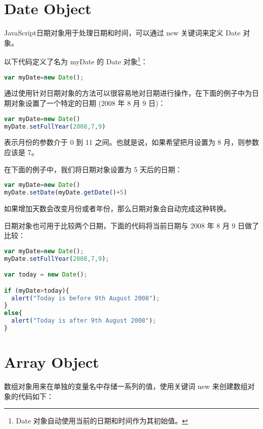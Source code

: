 \section{Date Object}


JavaScript日期对象用于处理日期和时间，可以通过 new 关键词来定义 Date 对象。

以下代码定义了名为 myDate 的 Date 对象\footnote{Date 对象自动使用当前的日期和时间作为其初始值。}：


\begin{lstlisting}[language=JavaScript]
var myDate=new Date();
\end{lstlisting}



通过使用针对日期对象的方法可以很容易地对日期进行操作，在下面的例子中为日期对象设置了一个特定的日期 (2008 年 8 月 9 日)：

\begin{lstlisting}[language=JavaScript]
var myDate=new Date()
myDate.setFullYear(2008,7,9)
\end{lstlisting}

表示月份的参数介于 0 到 11 之间。也就是说，如果希望把月设置为 8 月，则参数应该是 7。


在下面的例子中，我们将日期对象设置为 5 天后的日期：

\begin{lstlisting}[language=JavaScript]
var myDate=new Date()
myDate.setDate(myDate.getDate()+5)
\end{lstlisting}

如果增加天数会改变月份或者年份，那么日期对象会自动完成这种转换。

日期对象也可用于比较两个日期，下面的代码将当前日期与 2008 年 8 月 9 日做了比较：

\begin{lstlisting}[language=JavaScript]
var myDate=new Date();
myDate.setFullYear(2008,7,9);

var today = new Date();

if (myDate>today){
  alert("Today is before 9th August 2008");
}
else{
  alert("Today is after 9th August 2008");
}
\end{lstlisting}


\section{Array Object}

数组对象用来在单独的变量名中存储一系列的值，使用关键词 new 来创建数组对象的代码如下：


